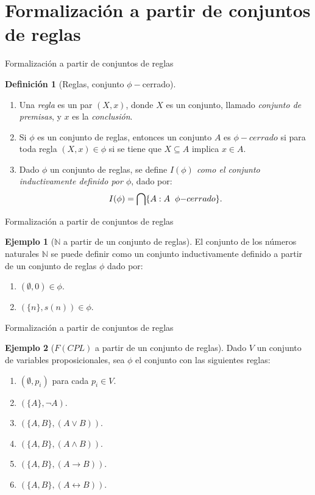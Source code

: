 \documentclass[dvipsnames, 8pt]{beamer} %
\theoremstyle{plain}
\newcommand{\N}{\mathbb{N}}
\theoremstyle{definition}
\newtheorem{defi}{Definición}
\newtheorem{ejemplo}{Ejemplo}
\begin{document}
\section{Formalización a partir de conjuntos de reglas}
\begin{frame}{Formalización a partir de conjuntos de reglas}
    \begin{defi}[Reglas, conjunto $\phi-$cerrado]
        \begin{enumerate}
            \item Una \emph{regla} es un par $(X,x)$, donde $X$ es un conjunto, llamado \emph{conjunto de premisas}, y $x$ es la \emph{conclusión}.\pause
            \item Si $\phi$ es un conjunto de reglas, entonces un conjunto $A$ es \emph{$\phi - cerrado$} si para toda regla $(X,x) \in \phi$ si se tiene que $X \subseteq A$ implica $x \in A$.\pause
            \item Dado $\phi$ un conjunto de reglas, se define \emph{$I(\phi)$ como el conjunto inductivamente definido por $\phi$}, dado por:
            $$I(\phi) = \bigcap \{A : A \hspace{2mm}\phi{-cerrado}\}.$$
        \end{enumerate}
    \end{defi}
\end{frame}

\begin{frame}{Formalización a partir de conjuntos de reglas}
    \begin{ejemplo}[$\N$ a partir de un conjunto de reglas]
        El conjunto de los números naturales $\N$ se puede definir como un conjunto inductivamente definido a partir de un conjunto de reglas $\phi$ dado por: \pause
        \begin{enumerate}
            \item $(\emptyset, 0) \in \phi$.\pause
            \item $(\{n\}, s(n)) \in \phi$.
        \end{enumerate}
    \end{ejemplo}
\end{frame}

\begin{frame}{Formalización a partir de conjuntos de reglas}
    \begin{ejemplo}[$F(CPL)$ a partir de un conjunto de reglas]
        Dado $V$ un conjunto de variables proposicionales, sea $\phi$ el conjunto con las siguientes reglas:
        \begin{enumerate}
            \item $(\emptyset, p_i)$ para cada $p_i \in V$.\pause
            \item $(\{A\}, \neg A)$.
            \item $(\{A, B\}, (A \lor B))$.
            \item $(\{A, B\}, (A \land B))$.
            \item $(\{A, B\}, (A \rightarrow B))$.
            \item $(\{A, B\}, (A \leftrightarrow B))$.
        \end{enumerate}
    \end{ejemplo}
\end{frame}
\end{document}
